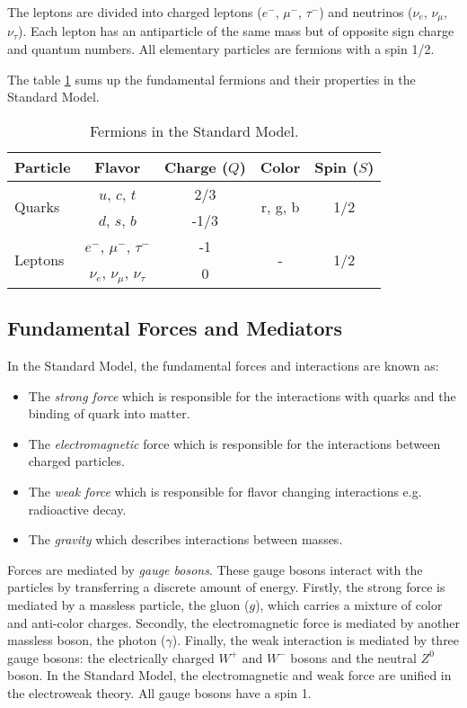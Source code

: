 The leptons are divided into charged leptons ($e^-$, $\mu^-$, $\tau^-$) and neutrinos ($\nu_e$, $\nu_{\mu}$, $\nu_{\tau}$). Each lepton has an antiparticle of the same mass but of opposite sign charge and quantum numbers. All elementary particles are fermions with a spin 1/2.

The table \ref{table:Fermions} sums up the fundamental fermions and their properties in the Standard Model.

\begin{table}[htb!]
  \centering
  \caption{Fermions in the Standard Model.}
  \label{table:Fermions}
  \begin{tabular}{|p{3cm}||cccc|}
    \hline
    Particle & Flavor & Charge ($Q$) & Color & Spin ($S$)\\
    \hline
    \multirow{2}{*}{Quarks} & $u$, $c$, $t$ & 2/3 & \multirow{2}{*}{r, g, b} & \multirow{2}{*}{1/2}\\
    & $d$, $s$, $b$ & -1/3 & & \\
    \hline
    \multirow{2}{*}{Leptons} & $e^-$, $\mu^-$, $\tau^-$ & -1 & \multirow{2}{*}{-} & \multirow{2}{*}{1/2}\\
    & $\nu_e$, $\nu_{\mu}$, $\nu_{\tau}$ & 0 & & \\
    \hline
  \end{tabular}
\end{table}

\subsection{Fundamental Forces and Mediators}

In the Standard Model, the fundamental forces and interactions are known as:
\begin{itemize}
  \item The \textit{strong force} which is responsible for the interactions with quarks and the binding of quark into matter.
  \item The \textit{electromagnetic} force which is responsible for the interactions between charged particles.
  \item The \textit{weak force} which is responsible for flavor changing interactions e.g. radioactive decay.
  \item The \textit{gravity} which describes interactions between masses.
\end{itemize}

Forces are mediated by \textit{gauge bosons}. These gauge bosons interact with the particles by transferring a discrete amount of energy. Firstly, the strong force is mediated by a massless particle, the gluon ($g$), which carries a mixture of color and anti-color charges. Secondly, the electromagnetic force is mediated by another massless boson, the photon ($\gamma$). Finally, the weak interaction is mediated by three gauge bosons: the electrically charged $W^+$ and $W^-$ bosons and the neutral $Z^0$ boson. In the Standard Model, the electromagnetic and weak force are unified in the electroweak theory. All gauge bosons have a spin 1.

